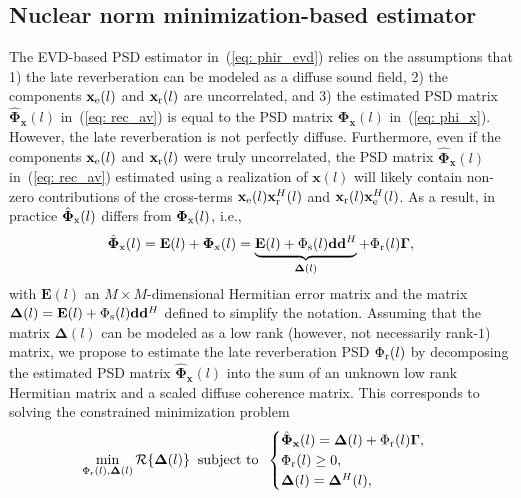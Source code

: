 \documentclass{article}
\begin{document}
\subsection{Nuclear norm minimization-based estimator}
\label{sec: nnm}
The EVD-based PSD estimator in~(\ref{eq: phir_evd}) relies on the assumptions that 1) the late reverberation can be modeled as a diffuse sound field, 2) the components $\mathbf{x}_{\rm e}(l)$ and $\mathbf{x}_{\rm r}(l)$ are uncorrelated, and 3) the estimated PSD matrix $\hat{\boldsymbol{\Phi}}_{\mathbf{x}}(l)$ in~(\ref{eq: rec_av}) is equal to the PSD matrix $\boldsymbol{\Phi}_{\mathbf{x}}(l)$ in~(\ref{eq: phi_x}). %
However, the late reverberation is not perfectly diffuse. 
Furthermore, even if the components $\mathbf{x}_{\rm e}(l)$ and $\mathbf{x}_{\rm r}(l)$ were truly uncorrelated, the PSD matrix $\hat{\boldsymbol{\Phi}}_{\mathbf{x}}(l)$ in~(\ref{eq: rec_av}) estimated using a realization of $\mathbf{x}(l)$ will likely contain non-zero contributions of the cross-terms $\mathbf{x}_{\rm e}(l) \mathbf{x}^{H}_{\rm r}(l)$ and $\mathbf{x}_{\rm r}(l) \mathbf{x}^{H}_{\rm e}(l)$.
As a result, in practice $\hat{\boldsymbol{\Phi}}_{\rm x}(l)$ differs from $\boldsymbol{\Phi}_{\rm x}(l)$, i.e.,
\begin{equation}
  \label{eq: corr_err}
  \hat{\boldsymbol{\Phi}}_{\rm x}(l) = \mathbf{E}(l) + \boldsymbol{\Phi}_{\rm x}(l) = \underbrace{\mathbf{E}(l) + \Phi_{\rm s}(l) \mathbf{d}\mathbf{d}^H}_{\mathbf{\Delta}(l)} + \Phi_{\rm r}(l) \boldsymbol{\Gamma},
\end{equation}
with $\mathbf{E}(l)$ an $M \times M$-dimensional Hermitian error matrix and the matrix $\mathbf{\Delta}(l) = \mathbf{E}(l) + \Phi_{\rm s}(l) \mathbf{d}\mathbf{d}^H$ defined to simplify the notation.
Assuming that the matrix $\mathbf{\Delta}(l)$ can be modeled as a low rank (however, not necessarily rank-$1$) matrix, we propose to estimate the late reverberation PSD $\Phi_{\rm r}(l)$ by decomposing the estimated PSD matrix $\hat{\boldsymbol{\Phi}}_{\mathbf{x}}(l)$ into the sum of an unknown low rank Hermitian matrix and a scaled diffuse coherence matrix. 
This corresponds to solving the constrained minimization problem
\begin{equation}
  \label{eq: rank_min}
  \min_{\Phi_{\rm r}(l),\mathbf{\Delta}(l)} {\cal{ R}}\{\mathbf{\Delta}(l)\} \; \; \text{subject to} \; \; \begin{cases}
    \hat{\boldsymbol{\Phi}}_{\mathbf{x}}(l) = \mathbf{\Delta}(l) + \Phi_{\rm r}(l)\boldsymbol{\Gamma},\\
    \Phi_{\rm r}(l) \geq 0,\\
    \mathbf{\Delta}(l) = \mathbf{\Delta}^H(l),
  \end{cases}
\end{equation}
\end{document}
